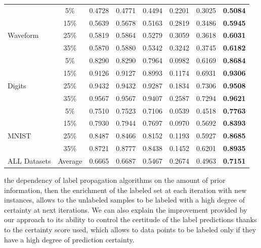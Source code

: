 \documentclass[conference]{IEEEtran}
\begin{document}
\begin{table}[h]
\begin{tabular}{lccccccc}
             & 5\%   & 0.4728  & 0.4771 &0.4494&0.2201 &0.3025 &\textbf{0.5084} \\
             & 15\%  & 0.5639  & 0.5678 &0.5163&0.2819 &0.3486 &\textbf{0.5945} \\ 
Waveform     & 25\%  & 0.5819  & 0.5864 &0.5279&0.3059 &0.3618 &\textbf{0.6031} \\ 
             & 35\%  & 0.5870  & 0.5880 &0.5342&0.3242 &0.3745 &\textbf{0.6182} \\ 
             
             & 5\%   & 0.8290  & 0.8290 &0.7964&0.0982 &0.6169 &\textbf{0.8684} \\
             & 15\%  & 0.9126  & 0.9127 &0.8993&0.1174 &0.6931 & \textbf{0.9306} \\ 
Digits       & 25\%  & 0.9432  & 0.9432 &0.9287&0.1834 &0.7306 &\textbf{0.9508}  \\ 
             & 35\%  & 0.9567  & 0.9567 &0.9407&0.2587 &0.7294 &\textbf{0.9621} \\ 
             
             & 5\%   & 0.7510  & 0.7523 &0.7106&0.0539 &0.4518 &\textbf{0.7763} \\
             & 15\% & 0.7930 & 0.7944 &0.7697&0.0970 &0.5692 &\textbf{0.8393} \\
MNIST        & 25\% &  0.8487 & 0.8466 &0.8152&0.1193 &0.5927 &\textbf{0.8685} \\
             & 35\% & 0.8721 & 0.8777 &0.8438&0.1452 &0.6201 &\textbf{0.8935} \\
             
\toprule 
ALL Datasets  & Average  & 0.6665  & 0.6687 & 0.5467 &0.2674 &0.4963 & \textbf{0.7151} \\ \toprule 
\end{tabular}
\label{ARI}
\vspace{-18mm}
\end{table} 
\newpage

the dependency of label propagation algorithms on the amount of prior information, then the enrichment of the labeled set at each iteration with new instances, allows to the unlabeled samples to be labeled with a high degree of certainty at next iterations. We can also explain the improvement provided by our approach to its ability to control the certitude of the label predictions thanks to the certainty score used, which allows to data points to be labeled only if they have a high degree of prediction certainty. 
\end{document}
